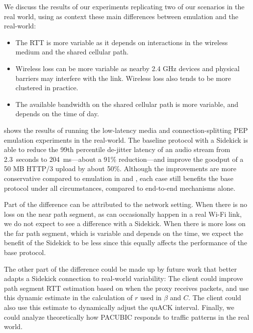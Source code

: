 

We discuss the results of our experiments replicating two of our scenarios in
the real world, using as context
these main differences between emulation and the real-world:

\begin{itemize}[noitemsep,topsep=0pt]
	\item The RTT is more variable as it depends on interactions in the
	wireless medium and the shared cellular path.
	\item Wireless loss can be more variable as nearby 2.4 GHz devices and
	physical barriers may interfere with the link. Wireless loss also tends
	to be more clustered in practice.
	\item The available bandwidth on the shared cellular path is more variable,
	and depends on the time of day.
\end{itemize}

 shows the results of running the low-latency media and
connection-splitting PEP emulation experiments in the real-world. The baseline
protocol with a Sidekick is able to
reduce the 99th percentile de-jitter latency of an audio stream
from 2.3~seconds to 204~ms---about a 91\% reduction---and
improve the goodput of a 50 MB HTTP/3 upload by about 50\%.
Although the improvements are more conservative compared to emulation in
 and , each case still benefits the
base protocol under all circumstances, compared to end-to-end mechanisms alone.

Part of the difference can be attributed to the network setting. When there is
no loss on the near path segment, as can occasionally happen in a real Wi-Fi link,
we do not expect to
see a difference with a Sidekick. When there is more loss on the far path segment, which
is variable and depends on the time, we
expect the benefit of the Sidekick to be less since this equally affects the
performance of the base protocol.

The other part of the difference could be made up by future work that better
adapts a Sidekick connection to real-world variability: The client could improve
path segment RTT estimation based on when the proxy receives packets, and use this
dynamic estimate in the calculation of $r$ used in $\beta$ and $C$.
The client could also use
this estimate to dynamically adjust the quACK interval.
Finally, we could analyze theoretically how PACUBIC responds
to traffic patterns in the real world.
